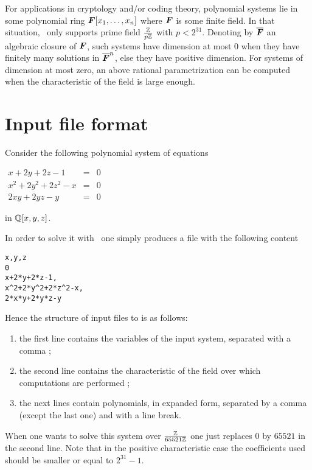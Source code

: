 \documentclass[a4paper,english,11pt]{scrartcl}
\theoremstyle{definition}
\theoremstyle{remark}
\begin{document}
For applications in cryptology and/or coding theory, polynomial systems lie in
some polynomial ring ${\bm{F}}[x_1, \ldots, x_n]$ where ${\bm{F}}$ is some finite field. In
that situation, \msolve~only supports prime field $\frac{\mathbb{Z}}{p\mathbb{Z}}$ with $p <
2^{31}$. Denoting by $\overline{{\bm{F}}}$ an algebraic closure of ${\bm{F}}$, such systems
have dimension at most $0$ when they have finitely many solutions in
$\overline{{\bm{F}}}^n$, else they have positive dimension. For systems of dimension
at most zero, an above rational parametrization can be computed when the
characteristic of the field is large enough. 

\section{Input file format}

Consider the following polynomial system of equations
\begin{center}
$
\begin{array}{rcl}
x+2y+2z-1 &= &0\\
x^2+2y^2+2z^2-x &= &0\\
2xy+2yz-y &= &0
\end{array}
$
\end{center}
in $\mathbb{Q}[x,y,z]$.

In order to solve it with \msolve~one simply produces a file with the following content
\begin{tcolorbox}
\begin{verbatim}
x,y,z
0
x+2*y+2*z-1,
x^2+2*y^2+2*z^2-x,
2*x*y+2*y*z-y
\end{verbatim}  
\end{tcolorbox}
Hence the structure of input files to \msolve is as follows:
\begin{enumerate}
\item the first line contains the variables of the input system, separated with
  a comma ; 
\item the second line contains the characteristic of the field over which
  computations are performed ; 
\item the next lines contain polynomials, in expanded form, separated by a comma
  (except the last one) and with a line break. 
\end{enumerate}



When one wants to solve this system over $\frac{\mathbb{Z}}{65521\mathbb{Z}}$ one just replaces
$0$ by $65521$ in the second line. Note that in the positive characteristic case
the coefficients used should be smaller or equal to $2^{31}-1$.
\end{document}
